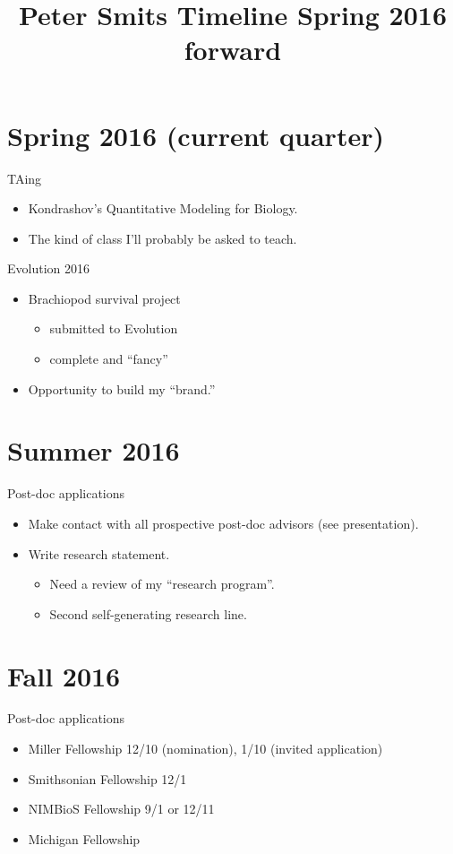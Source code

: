 \documentclass{article}
\title{Peter Smits Timeline Spring 2016 forward}
\date{}
\begin{document}
\linenumbers
\modulolinenumbers[2]

\maketitle

\section{Spring 2016 (current quarter)}
TAing 
\begin{itemize}
  \item Kondrashov's Quantitative Modeling for Biology.
  \item The kind of class I'll probably be asked to teach.
\end{itemize}

Evolution 2016
\begin{itemize}
  \item Brachiopod survival project
    \begin{itemize}
      \item submitted to Evolution
      \item complete and ``fancy''
    \end{itemize}
  \item Opportunity to build my ``brand.''
\end{itemize}


\section{Summer 2016}
Post-doc applications
\begin{itemize}
  \item Make contact with all prospective post-doc advisors (see presentation).
  \item Write research statement.
    \begin{itemize}
      \item Need a review of my ``research program''.
      \item Second self-generating research line.
    \end{itemize}
\end{itemize}


\section{Fall 2016}
Post-doc applications
\begin{itemize}
  \item Miller Fellowship 12/10 (nomination), 1/10 (invited application)
  \item Smithsonian Fellowship 12/1
  \item NIMBioS Fellowship 9/1 or 12/11
  \item Michigan Fellowship
\end{itemize}
\end{document}
